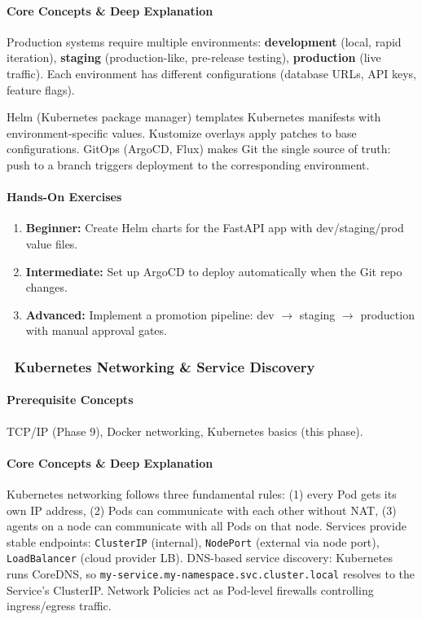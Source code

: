 \documentclass[11pt, a4paper, oneside]{report}
\newcommand{\awareness}[1]{\subsubsection{\texorpdfstring{\fcolorbox{gray!50}{gray!10}{\footnotesize\bfseries\color{gray!50!black} AWARENESS}~#1}{#1}}}
\newcommand{\arrow}{$\rightarrow$}
\begin{document}
\paragraph{Core Concepts \& Deep Explanation} Production systems require multiple environments: \textbf{development} (local, rapid iteration), \textbf{staging} (production-like, pre-release testing), \textbf{production} (live traffic). Each environment has different configurations (database URLs, API keys, feature flags).

Helm (Kubernetes package manager) templates Kubernetes manifests with environment-specific values. Kustomize overlays apply patches to base configurations. GitOps (ArgoCD, Flux) makes Git the single source of truth: push to a branch triggers deployment to the corresponding environment.

\paragraph{Hands-On Exercises}
\begin{enumerate}[leftmargin=*]
\item \textbf{Beginner:} Create Helm charts for the FastAPI app with dev/staging/prod value files.
\item \textbf{Intermediate:} Set up ArgoCD to deploy automatically when the Git repo changes.
\item \textbf{Advanced:} Implement a promotion pipeline: dev \arrow{} staging \arrow{} production with manual approval gates.
\end{enumerate}


\awareness{Kubernetes Networking \& Service Discovery}

\paragraph{Prerequisite Concepts} TCP/IP (Phase 9), Docker networking, Kubernetes basics (this phase).

\paragraph{Core Concepts \& Deep Explanation} Kubernetes networking follows three fundamental rules: (1) every Pod gets its own IP address, (2) Pods can communicate with each other without NAT, (3) agents on a node can communicate with all Pods on that node. Services provide stable endpoints: \texttt{ClusterIP} (internal), \texttt{NodePort} (external via node port), \texttt{LoadBalancer} (cloud provider LB). DNS-based service discovery: Kubernetes runs CoreDNS, so \texttt{my-service.my-namespace.svc.cluster.local} resolves to the Service's ClusterIP. Network Policies act as Pod-level firewalls controlling ingress/egress traffic.
\end{document}
